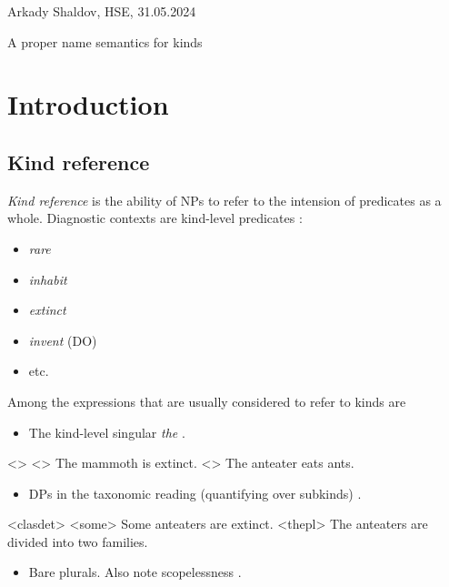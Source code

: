 \documentclass[a4paper,12pt]{article}
\begin{document}

Arkady Shaldov, HSE, 31.05.2024

{\huge A proper name semantics for kinds}

\section{Introduction}

\subsection{Kind reference}

\emph{Kind reference} is the ability of NPs to refer to the intension of predicates as a whole. Diagnostic contexts are kind-level predicates \parencite{carlson1977referencekindsenglish}:

\begin{itemize}
    \item \textit{rare}
    \item \textit{inhabit}
    \item \textit{extinct}
    \item \textit{invent} (DO)
    \item etc.
\end{itemize}

Among the expressions that are usually considered to refer to kinds are

\begin{itemize}
    \item The kind-level singular \textit{the} \parencite{carlson1977referencekindsenglish}.
\end{itemize}

\pex<>
    \a<> The mammoth is extinct.
    \a<> The anteater eats ants.
\xe

\begin{itemize}
    \item DPs in the taxonomic reading (quantifying over subkinds) \parencite{dayal2004numbermarkingdefiniteness}.     
\end{itemize}    

\pex<clasdet>
    \a<some> Some anteaters are extinct.
    \a<thepl> The anteaters are divided into two families.
\xe

\begin{itemize}
    \item Bare plurals. Also note scopelessness \parencite{chierchia1998referencekindslanguages}.
\end{itemize}
    
\end{document}

